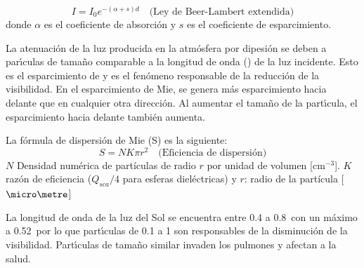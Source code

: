 \begin{equation}
I = I_0 e^{-(\alpha + s)d} \quad \text{(Ley de Beer-Lambert extendida)}
\end{equation}
donde $\alpha$ es el coeficiente de absorci\'on y $s$ es el coeficiente de esparcimiento.

La atenuaci\'on de la luz producida en la atm\'osfera por dipesi\'on se deben a par\'{\i}culas de tama\~no comparable a la longitud de onda () de la luz incidente. Esto es el esparcimiento de  y es el fen\'omeno responsable de la reducci\'on de la visibilidad. En el esparcimiento de Mie, se genera m\'as esparcimiento hacia delante que en cualquier otra direcci\'on. Al aumentar el tama\~no de la part\'{\i}cula, el esparcimiento hacia delante tambi\'en aumenta.


La f\'ormula de dispersi\'on de Mie (S) es la siguiente:
\begin{equation}
S = NK\pi r^2 \quad \text{(Eficiencia de dispersión)}
\end{equation}
$N$ Densidad numérica  de part\'iculas de radio $r$ por unidad de volumen [cm$^{-3}$]. $K$ razón de eficiencia (${Q_{sca}}/{4}$ para esferas dieléctricas) y
$r$: radio de la partícula [$\micro\metre$]

La longitud de onda de la luz del Sol se encuentra entre 0.4 a 0.8\micro\metre\,  con un m\'aximo a 0.52\micro\metre\, por lo que part\'{\i}culas de 0.1 a 1{\micro\metre} son responsables de la disminuci\'on de la visibilidad. Part\'{\i}culas de tama\~no similar invaden los pulmones y afectan a la salud.

